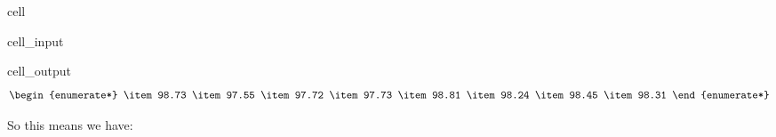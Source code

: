 \documentclass[letterpaper,10pt,english]{jupyterBook}
\begin{document}
\begin{sphinxuseclass}{cell}\begin{sphinxVerbatimInput}

\begin{sphinxuseclass}{cell_input}
\begin{sphinxVerbatim}[commandchars=\\\{\}]
\end{sphinxVerbatim}

\end{sphinxuseclass}\end{sphinxVerbatimInput}
\begin{sphinxVerbatimOutput}

\begin{sphinxuseclass}{cell_output}\begin{equation*}
\begin{split}\begin{enumerate*}
\item 98.73
\item 97.55
\item 97.72
\item 97.73
\item 98.81
\item 98.24
\item 98.45
\item 98.31
\end{enumerate*}\end{split}
\end{equation*}
\end{sphinxuseclass}\end{sphinxVerbatimOutput}

\end{sphinxuseclass}
\sphinxAtStartPar
So this means we have:
\end{document}
